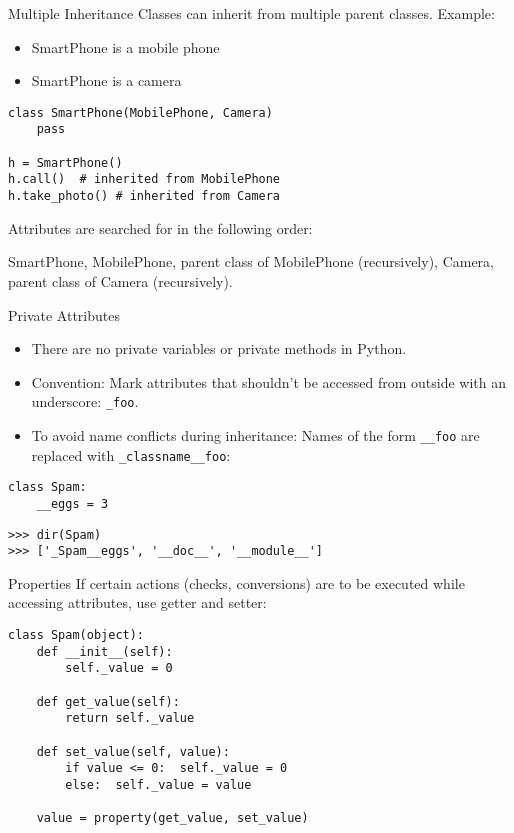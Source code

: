 \begin{frame}[fragile]{Multiple Inheritance}
Classes can inherit from multiple parent classes. Example:
\begin{itemize}
\item SmartPhone is a mobile phone
\item SmartPhone is a camera
\end{itemize}
\begin{lstlisting}[style=Python]
class SmartPhone(MobilePhone, Camera)
    pass

h = SmartPhone()
h.call()  # inherited from MobilePhone
h.take_photo() # inherited from Camera
\end{lstlisting}
Attributes are searched for in the following order:

SmartPhone, MobilePhone, parent class of MobilePhone (recursively), Camera, parent class of Camera (recursively).
\end{frame}

\begin{frame}[fragile]{Private Attributes}
\begin{itemize}
\item There are no private variables or private methods in Python.
\item \alert{Convention:} Mark attributes that shouldn't be accessed from outside with an underscore: \lstinline{_foo}.
\item To avoid name conflicts during inheritance: Names of the form \lstinline{__foo} are replaced with \lstinline{_classname__foo}:
\end{itemize}
\begin{lstlisting}[style=Python]
class Spam:
    __eggs = 3
\end{lstlisting}
\begin{lstlisting}[style=Shell]
>>> dir(Spam)
>>> ['_Spam__eggs', '__doc__', '__module__']
\end{lstlisting}
\end{frame}

\begin{frame}[fragile]{Properties}
If certain actions (checks, conversions) are to be executed while accessing attributes, use \alert{getter} and \alert{setter}:
\begin{lstlisting}[style=Python]
class Spam(object):
    def __init__(self):
        self._value = 0
    
    def get_value(self):
        return self._value

    def set_value(self, value):
        if value <= 0:  self._value = 0
        else:  self._value = value

    value = property(get_value, set_value)
\end{lstlisting}
\end{frame}

